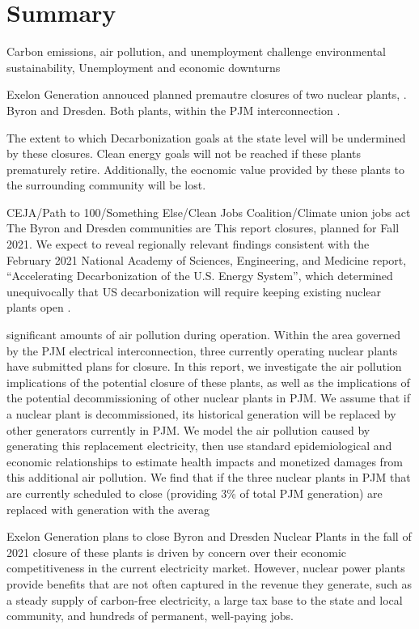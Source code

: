 \section{Summary}

Carbon emissions, air pollution, and unemployment challenge environmental sustainability,   Unemployment and economic downturns 

Exelon Generation annouced planned premautre closures of two nuclear plants, .
Byron and Dresden. Both plants, within the PJM interconnection . 

The extent to which Decarbonization goals at the state level will be undermined by these closures.  
Clean energy goals will not be reached if these plants prematurely retire. Additionally, the eocnomic value provided by these plants to the surrounding community will be lost. 



CEJA/Path to 100/Something Else/Clean Jobs Coalition/Climate union jobs act
The Byron and Dresden communities are 
 This report  closures, planned for Fall 2021.  We expect to reveal regionally relevant findings consistent with the February 2021 National Academy of Sciences, Engineering, and Medicine report, “Accelerating Decarbonization of the U.S. Energy System”, which determined unequivocally that US decarbonization will require keeping existing nuclear plants open \cite{national_accelerating_2021}.

significant amounts of air pollution during operation. Within the area governed by the PJM electrical
interconnection, three currently operating nuclear
plants have submitted plans for closure. In this report, we investigate the air pollution implications of
the potential closure of these plants, as well as the
implications of the potential decommissioning of
other nuclear plants in PJM. We assume that if a nuclear plant is decommissioned, its historical generation will be replaced by other generators currently
in PJM. We model the air pollution caused by generating this replacement electricity, then use standard
epidemiological and economic relationships to estimate health impacts and monetized damages from
this additional air pollution. We find that if the
three nuclear plants in PJM that are currently scheduled to close (providing 3\% of total PJM generation)
are replaced with generation with the averag


Exelon Generation plans to close Byron and Dresden Nuclear Plants in the fall of 
2021 closure of these plants is driven by concern over their
economic competitiveness in the current electricity market. However, nuclear power plants
provide benefits that are not often captured in the revenue they generate, such as a steady
supply of carbon-free electricity, a large tax base to the state and local community, and
hundreds of permanent, well-paying jobs.

